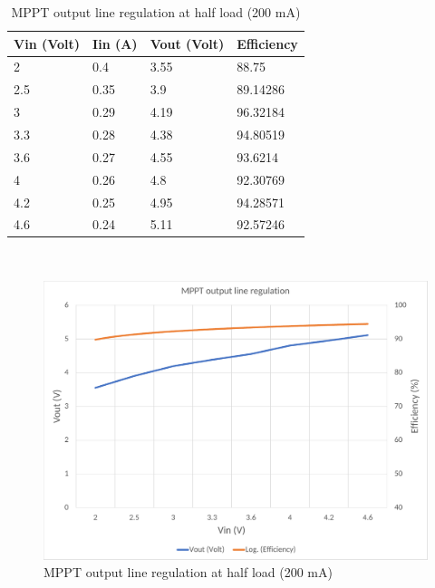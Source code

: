 \begin{table}[H]
\centering
\begin{tabular}{|l|l|l|l|}
\hline
Vin (Volt) & Iin (A) & Vout (Volt) & Efficiency \\ \hline
2          & 0.4     & 3.55        & 88.75      \\ \hline
2.5        & 0.35    & 3.9         & 89.14286   \\ \hline
3          & 0.29    & 4.19        & 96.32184   \\ \hline
3.3        & 0.28    & 4.38        & 94.80519   \\ \hline
3.6        & 0.27    & 4.55        & 93.6214    \\ \hline
4          & 0.26    & 4.8         & 92.30769   \\ \hline
4.2        & 0.25    & 4.95        & 94.28571   \\ \hline
4.6        & 0.24    & 5.11        & 92.57246   \\ \hline
\end{tabular}
\caption{MPPT output line regulation at half load (200 mA)}
\label{table:4}
\end{table}	
\\
\begin{figure}[h]
	\centering
	\includegraphics[width=\columnwidth]{IMGS/MPPT output line regulation at half load (200mA).pdf}
	\caption{MPPT output line regulation at half load (200 mA)}
	\label{fig:arch}
\end{figure}

